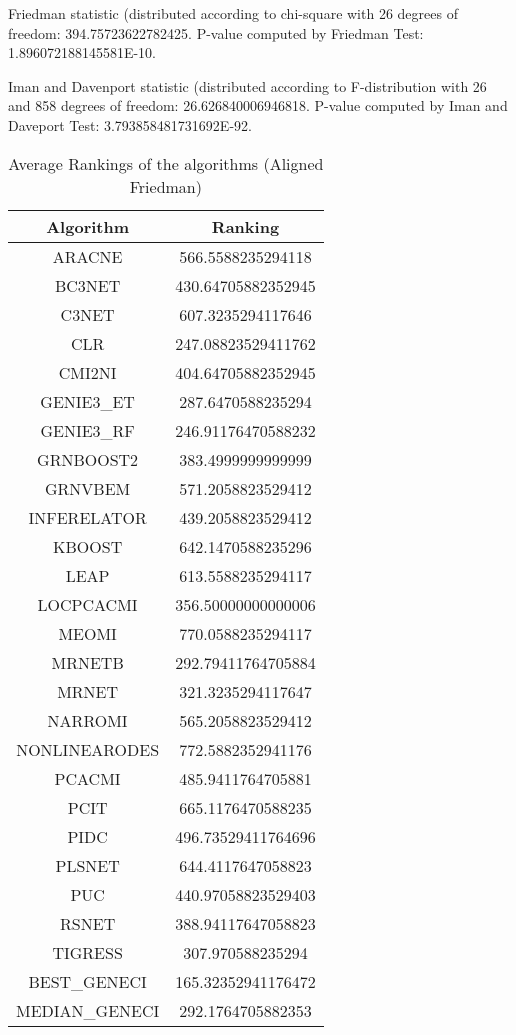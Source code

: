 \documentclass[a4paper,10pt]{article}
\begin{document}
\begin{landscape}
Friedman statistic (distributed according to chi-square with 26 degrees of freedom: 394.75723622782425. 
P-value computed by Friedman Test: 1.896072188145581E-10.\newline

Iman and Davenport statistic (distributed according to F-distribution with 26 and 858 degrees of freedom: 26.626840006946818. 
P-value computed by Iman and Daveport Test: 3.793858481731692E-92.\newline


\newpage

\begin{table}[!htp]
\centering
\caption{Average Rankings of the algorithms (Aligned Friedman)
}\begin{tabular}{c|c}
Algorithm&Ranking\\
\hline
ARACNE&566.5588235294118\\
BC3NET&430.64705882352945\\
C3NET&607.3235294117646\\
CLR&247.08823529411762\\
CMI2NI&404.64705882352945\\
GENIE3_ET&287.6470588235294\\
GENIE3_RF&246.91176470588232\\
GRNBOOST2&383.4999999999999\\
GRNVBEM&571.2058823529412\\
INFERELATOR&439.2058823529412\\
KBOOST&642.1470588235296\\
LEAP&613.5588235294117\\
LOCPCACMI&356.50000000000006\\
MEOMI&770.0588235294117\\
MRNETB&292.79411764705884\\
MRNET&321.3235294117647\\
NARROMI&565.2058823529412\\
NONLINEARODES&772.5882352941176\\
PCACMI&485.9411764705881\\
PCIT&665.1176470588235\\
PIDC&496.73529411764696\\
PLSNET&644.4117647058823\\
PUC&440.97058823529403\\
RSNET&388.94117647058823\\
TIGRESS&307.970588235294\\
BEST_GENECI&165.32352941176472\\
MEDIAN_GENECI&292.1764705882353\\
\end{tabular}
\end{table}



\end{landscape}
\end{document}
